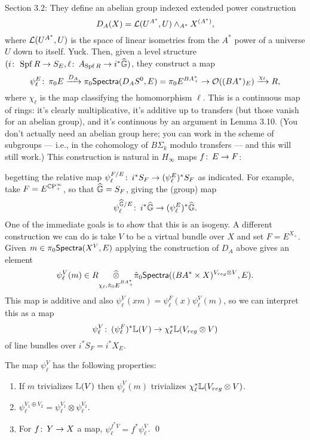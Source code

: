 Section 3.2: They define an abelian group indexed extended power construction \[D_A(X) = \mathcal{L}(U^{A^*}, U) \wedge_{A^*} X^{(A^*)},\] where $\mathcal{L}(U^{A^*}, U)$ is the space of linear isometries from the $A^*${\th} power of a universe $U$ down to itself.  Yuck.  Then, given a level structure $(i\colon\thinspace \operatorname{Spf} R \to S_E, \ell\colon\thinspace A_{\operatorname{Spf} R} \to i^* \widehat{\mathbb G})$, they construct a map \[\psi^E_\ell \colon\thinspace \pi_0 E \xrightarrow{D_A} \pi_0 \mathsf{Spectra}(D_A S^0, E) = \pi_0 E^{BA^*_+} \to \mathcal{O}((BA^*)_E) \xrightarrow{\chi_\ell} R,\] where $\chi_\ell$ is the map classifying the homomorphism $\ell$.  This is a continuous map of rings: it's clearly multiplicative, it's additive up to transfers (but those vanish for an abelian group), and it's continuous by an argument in Lemma 3.10.  (You don't actually need an abelian group here; you can work in the scheme of subgroups --- i.e., in the cohomology of $B\Sigma_k$ modulo transfers --- and this will still work.)  This construction is natural in $H_\infty$ maps $f\colon\thinspace E \to F$:
\begin{center}
\end{center}
begetting the relative map $\psi_\ell^{F/E}\colon\thinspace i^* S_F \to (\psi_\ell^E)^* S_F$ as indicated.  For example, take $F = E^{\mathbb{C}\mathrm P^\infty_+}$, so that $\widehat{\mathbb G} = S_F$, giving the (group) map \[\psi_\ell^{\widehat{\mathbb G}/E}\colon\thinspace i^* \widehat{\mathbb G} \to (\psi_\ell^E)^* \widehat{\mathbb G}.\]  One of the immediate goals is to show that this is an isogeny.  A different construction we can do is take $V$ to be a virtual bundle over $X$ and set $F = E^{X_+}$.  Given $m \in \pi_0 \mathsf{Spectra}(X^V, E)$ applying the construction of $D_A$ above gives an element \[\psi_\ell^V(m) \in R \underset{\chi_\ell, \hat\pi_0 E^{BA^*_+}}{\widehat{\otimes}} \hat\pi_0 \mathsf{Spectra}((BA^* \times X)^{V_{reg} \otimes V}, E).\]  This map is additive and also $\psi_\ell^V(xm) = \psi_\ell^F(x) \psi_\ell^V(m)$, so we can interpret this as a map \[\psi_\ell^V\colon\thinspace (\psi_\ell^F)^* \mathbb{L}(V) \to \chi_\ell^*\mathbb{L}(V_{reg} \otimes V)\] of line bundles over $i^* S_F = i^* X_E$.

\begin{lemma}
The map $\psi_\ell^V$ has the following properties:
\begin{enumerate}
\item If $m$ trivializes $\mathbb{L}(V)$ then $\psi_\ell^V(m)$ trivializes $\chi_\ell^* \mathbb{L}(V_{reg} \otimes V)$.
\item $\psi_\ell^{V_1 \oplus V_2} = \psi_\ell^{V_1} \otimes \psi_\ell^{V_2}$.
\item For $f\colon\thinspace Y \to X$ a map, $\psi_\ell^{f^* V} = f^* \psi_\ell^V$. \qed 
\end{enumerate}
\end{lemma}

